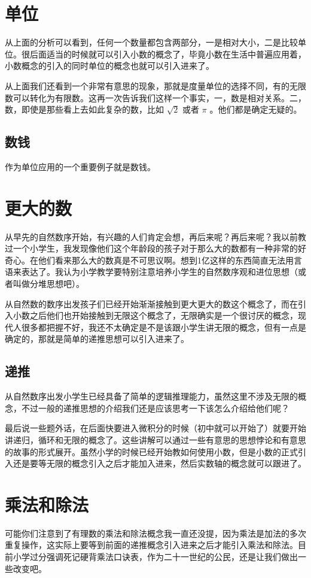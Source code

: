 \documentclass[11pt,oneside]{article}
\begin{document}
\section{单位}
\label{sec-7}
从上面的分析可以看到，任何一个数量都包含两部分，一是相对大小，二是比较单位。很后面适当的时候就可以引入小数的概念了，毕竟小数在生活中普遍应用着，小数概念的引入的同时单位的概念也就可以引入进来了。

从上面我们还看到一个非常有意思的现象，那就是度量单位的选择不同，有的无限数可以转化为有限数。这再一次告诉我们这样一个事实，一，数是相对关系。二，数，即使是那些看上去如此复杂的数，比如 $\sqrt{2}$ 或者 $\pi$ 。他们都是确定无疑的。

\subsection{数钱}
\label{sec-7-1}
作为单位应用的一个重要例子就是数钱。

\section{更大的数}
\label{sec-8}
从早先的自然数序开始，有兴趣的人们肯定会想，再后来呢？再后来呢？我以前教过一个小学生，我发现像他们这个年龄段的孩子对于那么大的数都有一种非常的好奇心。在他们看来那么大的数真是不可思议啊。想到1亿这样的东西简直无法用言语来表达了。我认为小学教学要特别注意培养小学生的自然数序观和进位思想（或者叫做分堆思想吧）。

从自然数的数序出发孩子们已经开始渐渐接触到更大更大的数这个概念了，而在引入小数之后他们也开始接触到无限这个概念了，无限确实是一个很讨厌的概念，现代人很多都把握不好，我还不太确定是不是该跟小学生讲无限的概念，但有一点是确定的，那就是简单的递推思想可以引入进来了。


\subsection{递推}
\label{sec-8-1}
从自然数序出发小学生已经具备了简单的逻辑推理能力，虽然这里不涉及无限的概念，不过一般的递推思想的介绍我们还是应该思考一下该怎么介绍给他们呢？


最后说一些题外话，在后面快要进入微积分的时候（初中就可以开始了）就要开始讲递归，循环和无限的概念了。这些讲解可以通过一些有意思的思想悖论和有意思的故事的形式展开。虽然小学的时候已经开始教如何使用小数，但是小数的正式引入还是要等无限的概念引入之后才能加入进来，然后实数轴的概念就可以跟进了。


\section{乘法和除法}
\label{sec-9}
可能你们注意到了有理数的乘法和除法概念我一直还没提，因为乘法是加法的多次重复操作，这实际上要等到前面的递推概念引入进来之后才能引入乘法和除法。目前小学过分强调死记硬背乘法口诀表，作为二十一世纪的公民，还是让我们做出一些改变吧。
\end{document}

